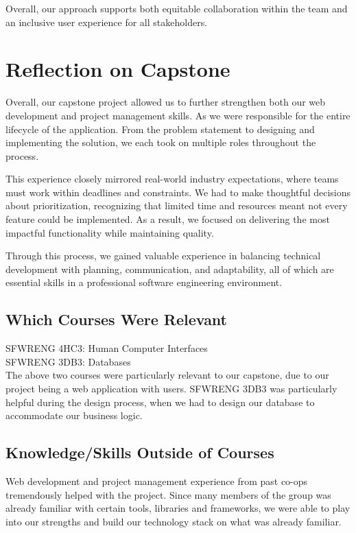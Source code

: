 \documentclass{article}
\begin{document}
Overall, our approach supports both equitable collaboration within the team and an inclusive user experience for all stakeholders.

\section{Reflection on Capstone}
Overall, our capstone project allowed us to further strengthen both our web development and project management skills. As we were responsible for the entire lifecycle of the application. From the problem statement to designing and implementing the solution, we each took on multiple roles throughout the process.

This experience closely mirrored real-world industry expectations, where teams must work within deadlines and constraints. We had to make thoughtful decisions about prioritization, recognizing that limited time and resources meant not every feature could be implemented. As a result, we focused on delivering the most impactful functionality while maintaining quality.

Through this process, we gained valuable experience in balancing technical development with planning, communication, and adaptability, all of which are essential skills in a professional software engineering environment.

\subsection{Which Courses Were Relevant}
SFWRENG 4HC3: Human Computer Interfaces \\
SFWRENG 3DB3: Databases \\

The above two courses were particularly relevant to our capstone, due to our project being a web application with users. SFWRENG 3DB3 was particularly helpful during the design process, when we had to design our database to accommodate our business logic.

\subsection{Knowledge/Skills Outside of Courses}
Web development and project management experience from past co-ops tremendously helped with the project. Since many members of the group was already familiar with certain tools, libraries and frameworks, we were able to play into our strengths and build our technology stack on what was already familiar.
\end{document}
